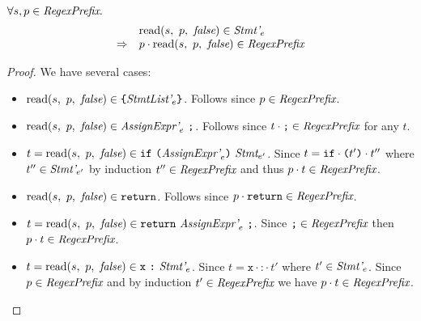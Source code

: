 \documentclass[preprint,10pt]{sigplanconf}
\begin{document}
\begin{lemma}\mbox{}

  \( \forall s, p \in \textit{RegexPrefix}. \)
  \[
  \begin{array}{rl}
  &\textrm{read}(s,~p,~\textit{false}) \in \textit{Stmt'}_{e} 
  \\
  \Rightarrow& p \cdot \textrm{read}(s,~p,~\textit{false}) \in \textit{RegexPrefix}
  \end{array}
  \]
\end{lemma}
\begin{proof}
  We have several cases:
  \begin{itemize}
  \item \( \textrm{read}(s,~p,~\textit{false}) \in \texttt{\{}\textit{StmtList'}_{e}\texttt{\}}
    \). Follows since \( p \in \textit{RegexPrefix} \).

  \item \( \textrm{read}(s,~p,~\textit{false}) \in \textit{AssignExpr'}_{e}~\texttt{;}
    \). Follows since \( t \cdot \texttt{;} \in \textit{RegexPrefix} \) for any
    \( t \).
    
  \item \( t = \textrm{read}(s,~p,~\textit{false}) \in \texttt{if}~\texttt{(}\textit{AssignExpr'}_{e}\texttt{)}~\textit{Stmt}_{e'} \). Since
    \( t = \texttt{if}\cdot \texttt{(}t'\texttt{)}\cdot t'' \) where \( t'' \in
    \textit{Stmt'}_{e'} \) by induction \( t'' \in \textit{RegexPrefix} \) and
    thus \( p \cdot t \in \textit{RegexPrefix} \).

  \item \( \textrm{read}(s,~p,~\textit{false}) \in \texttt{return} \).
    Follows since \( p \cdot \texttt{return} \in \textit{RegexPrefix} \).
    
  \item \( t = \textrm{read}(s,~p,~\textit{false}) \in
    \texttt{return}~\textit{AssignExpr'}_{e}~ \texttt{;} \). 
    Since \( \texttt{;} \in \textit{RegexPrefix} \) then \( p \cdot t \in
    \textit{RegexPrefix} \).

  \item \( t = \textrm{read}(s,~p,~\textit{false}) \in
    \texttt{x}~\texttt{:}~\textit{Stmt'}_{e} \). Since \( t = \texttt{x}\cdot
    \texttt{:}\cdot t' \) where \( t' \in \textit{Stmt'}_{e} \). Since
    \( p \in \textit{RegexPrefix} \) and by induction \( t' \in \textit{RegexPrefix} \) we
    have \( p \cdot t \in \textit{RegexPrefix} \).

  \end{itemize}
\end{proof}
\end{document}
